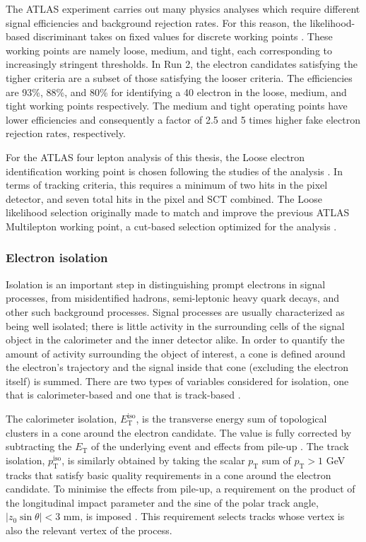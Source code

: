 The ATLAS experiment carries out many physics analyses which require different signal efficiencies and background rejection rates. For this reason, the likelihood-based discriminant takes on fixed values for discrete working points \cite{ATLAS_electron_efficiency_2015-2016}. These working points are namely loose, medium, and tight, each corresponding to increasingly stringent thresholds. In Run 2, the electron candidates satisfying the tigher criteria are a subset of those satisfying the looser criteria. The efficiencies are 93\%, 88\%, and 80\% for identifying a \unit{40}{\GeV} electron in the loose, medium, and tight working points respectively. The medium and tight operating points have lower efficiencies and consequently a factor of 2.5 and 5 times higher fake electron rejection rates, respectively. 

For the ATLAS four lepton analysis of this thesis, the Loose electron identification working point is chosen following the studies of the \HFourL{} analysis \cite{ATLAS_H4l_2015}. In terms of tracking criteria, this requires a minimum of two hits in the pixel detector, and seven total hits in the pixel and SCT combined. The Loose likelihood selection originally made to match and improve the previous ATLAS Multilepton working point, a cut-based selection optimized for the \HFourL{} analysis \cite{ATLAS_muon_reco_2011}.

\subsubsection{Electron isolation}

Isolation is an important step in distinguishing prompt electrons in signal processes, from misidentified hadrons, semi-leptonic heavy quark decays, and other such background processes. Signal processes are usually characterized as being well isolated; there is little activity in the surrounding cells of the signal object in the calorimeter and the inner detector alike. In order to quantify the amount of activity surrounding the object of interest, a cone is defined around the electron's trajectory and the signal inside that cone (excluding the electron itself) is summed. There are two types of variables considered for isolation, one that is calorimeter-based and one that is track-based \cite{ATLAS_electron_efficiency_2015-2016}. 

The calorimeter isolation, $E_{\text{T}}^{\text{iso}}$, is the transverse energy sum of topological clusters in a cone around the electron candidate. The value is fully corrected by subtracting the $E_{\text{T}}$ of the underlying event and effects from pile-up \cite{ATLAS_electron_photon_triggers_run2, ATLAS_electron_efficiency_2015-2016}. The track isolation, $p_{\text{T}}^{\text{iso}}$, is similarly obtained by taking the scalar $p_{\text{T}}$ sum of $p_{\text{T}}>1$ GeV tracks that satisfy basic quality requirements in a cone around the electron candidate. To minimise the effects from pile-up, a requirement on the product of the longitudinal impact parameter and the sine of the polar track angle, $|z_0\sin\theta|<3$ mm, is imposed \cite{ATLAS_electron_efficiency_2015-2016}. This requirement selects tracks whose vertex is also the relevant vertex of the process. 

